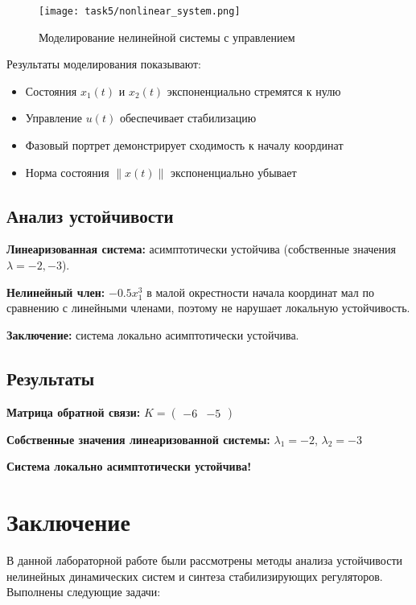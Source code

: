 \begin{figure}[H]
\centering
\texttt{[image: task5/nonlinear\_system.png]}
\caption{Моделирование нелинейной системы с управлением}
\label{fig:nonlinear_system}
\end{figure}

Результаты моделирования показывают:
\begin{itemize}
\item Состояния $x_1(t)$ и $x_2(t)$ экспоненциально стремятся к нулю
\item Управление $u(t)$ обеспечивает стабилизацию
\item Фазовый портрет демонстрирует сходимость к началу координат
\item Норма состояния $\|x(t)\|$ экспоненциально убывает
\end{itemize}

\subsection*{Анализ устойчивости}

\textbf{Линеаризованная система:} асимптотически устойчива (собственные значения $\lambda = -2, -3$).

\textbf{Нелинейный член:} $-0.5x_1^3$ в малой окрестности начала координат мал по сравнению с линейными членами, поэтому не нарушает локальную устойчивость.

\textbf{Заключение:} система локально асимптотически устойчива.

\subsection*{Результаты}

\textbf{Матрица обратной связи:} $K = \begin{pmatrix} -6 & -5 \end{pmatrix}$

\textbf{Собственные значения линеаризованной системы:} $\lambda_1 = -2$, $\lambda_2 = -3$

\textbf{Система локально асимптотически устойчива!}

\section*{Заключение}

В данной лабораторной работе были рассмотрены методы анализа устойчивости нелинейных динамических систем и синтеза стабилизирующих регуляторов. Выполнены следующие задачи:

